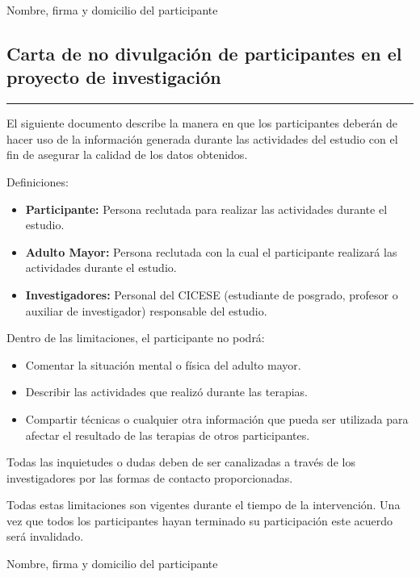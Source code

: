 Nombre, firma y domicilio del participante
\pagebreak
\subsection{Carta de no divulgaci\'on de participantes en el proyecto de investigaci\'on} \label{aped:cartanodiv}
\vspace{-3ex}%
\noindent
\rule{\textwidth}{1pt}
\vspace{-2ex}%

El siguiente documento describe la manera en que los participantes deberán de hacer uso de la información generada durante las actividades del estudio con el fin de asegurar la calidad de los datos obtenidos.

Definiciones:
\begin{itemize}
        \item \textbf{Participante:} Persona reclutada para realizar las actividades durante el estudio.
        \item \textbf{Adulto Mayor:} Persona reclutada con la cual el participante realizará las actividades durante el estudio.
        \item \textbf{Investigadores:} Personal del CICESE (estudiante de posgrado, profesor o auxiliar de investigador) responsable del estudio.
\end{itemize}
Dentro de las limitaciones, el participante no podrá:
\begin{itemize}
        \item Comentar la situación mental o física del adulto mayor.
        \item Describir las actividades que realizó durante las terapias.
        \item Compartir técnicas o cualquier otra información que pueda ser utilizada para afectar el resultado de las terapias de otros participantes.
\end{itemize}

Todas las inquietudes o dudas deben de ser canalizadas a través de los investigadores por las formas de contacto proporcionadas.

Todas estas limitaciones son vigentes durante el tiempo de la intervención. Una vez que todos los participantes hayan terminado su participación este acuerdo será invalidado.

Nombre, firma y domicilio del participante
